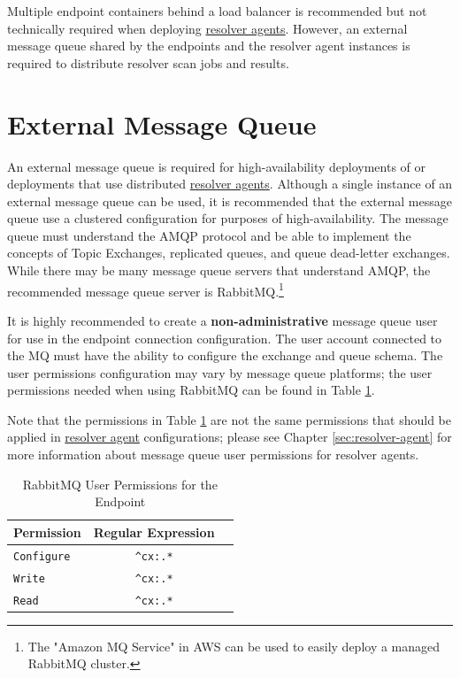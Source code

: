 Multiple \cxoneflow endpoint containers behind a load balancer is recommended but not technically required
when deploying \hyperref[sec:resolver-agent]{resolver agents}.  However, an external message queue shared by the \cxoneflow endpoints
and the resolver agent instances is required to distribute resolver scan jobs and results.  

\section{External Message Queue}\label{sec:external-mq}

An external message queue is required for high-availability deployments of \cxoneflow or deployments that use distributed
\hyperref[sec:resolver-agent]{resolver agents}.  Although a single instance of an external message queue can be used, it is
recommended that the external message queue use a clustered configuration for purposes of high-availability.  The message queue
must understand the AMQP protocol and be able to implement the concepts of Topic Exchanges, replicated queues, and queue
dead-letter exchanges.  While there may be many message queue servers that understand AMQP, the recommended message queue
server is RabbitMQ.\footnote{The "Amazon MQ Service" in AWS can be used to easily deploy a managed RabbitMQ cluster.}

It is highly recommended to create a \textbf{non-administrative} message queue user for use in the \cxoneflow endpoint
connection configuration.  The user account connected to the MQ must have the ability to configure the
exchange and queue schema.  The user permissions configuration may vary by message queue platforms; the user permissions
needed when using RabbitMQ can be found in Table \ref{tab:server-mq-user-perms}.  

Note that the permissions in Table \ref{tab:server-mq-user-perms} are not the same permissions
that should be applied in \hyperref[sec:resolver-agent]{resolver agent} configurations; please see Chapter \ref{sec:resolver-agent} for more
information about message queue user permissions for resolver agents.

\begin{table}[ht]
    \caption{RabbitMQ User Permissions for the \cxoneflow Endpoint}  
    \label{tab:server-mq-user-perms}      
    \begin{tabularx}{\textwidth}{lcl}
        \toprule
        \textbf{Permission} & \textbf{Regular Expression} \\
        \midrule
        \texttt{Configure} & \texttt{\^{}cx:.*} \\
        \midrule
        \texttt{Write} & \texttt{\^{}cx:.*} \\
        \midrule
        \texttt{Read} & \texttt{\^{}cx:.*} \\
        \midrule
        \bottomrule
    \end{tabularx}
\end{table}



